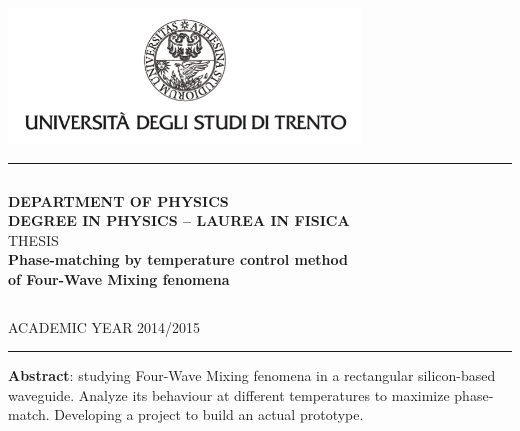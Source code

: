 \documentclass[11pt,a4paper]{article}
\begin{document}
\begin{titlepage}
\begin{center}

\includegraphics[width=0.7\textwidth]{unitn_logo.png}~\\[1.2cm]

\hrule
$$$$
$$$$

\textsc{\LARGE \textbf{DEPARTMENT OF PHYSICS}}\\[0.5cm]
\textsc{\LARGE \textbf{DEGREE IN PHYSICS – LAUREA IN FISICA}}\\[2.5cm]
\textsc{\Large THESIS}\\[1.3cm]

{ \huge \bfseries Phase-matching by temperature control method}\\
[0.5cm]
{ \huge \bfseries of Four-Wave Mixing fenomena}\\
[3.0cm]

\begin{parcolumns}{2}
\end{parcolumns}
$$$$
$$$$
$$$$
$$$$
$$$$
$$$$
$$$$
$$$$

\large ACADEMIC YEAR 2014/2015
\hrule
\vfill
\textbf{Abstract}: studying Four-Wave Mixing fenomena in a rectangular silicon-based waveguide. Analyze its behaviour at different temperatures to maximize phase-match. Developing a project to build an actual prototype.

\vfill

{\large}

\end{center}
\end{titlepage}
\end{document}
